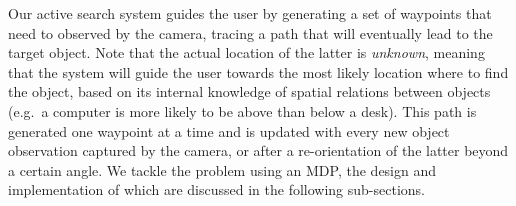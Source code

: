 \documentclass[a4paper, twoside]{article}
\begin{document}
\noindent Our active search system guides the user by generating a set of waypoints that need to observed by the camera, tracing a path that will eventually lead to the target object. Note that the actual location of the latter is {\em unknown}, meaning that the system will guide the user towards the most likely location where to find the object, based on its internal knowledge of spatial relations between objects (e.g.\ a computer is more likely to be above than below a desk). This path is generated one waypoint at a time and is updated with every new object observation captured by the camera, or after a re-orientation of the latter beyond a certain angle. We tackle the problem using an MDP, the design and implementation of which are discussed in the following sub-sections. %



\end{document}
